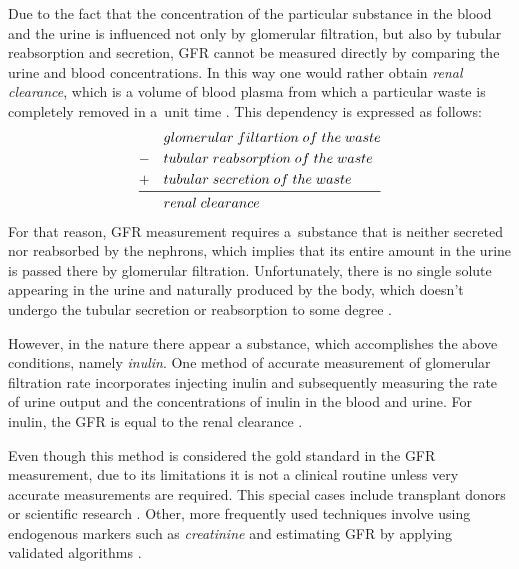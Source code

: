Due to the fact that the concentration of the particular substance in the blood and the urine is influenced not only by glomerular filtration, but also by tubular reabsorption and secretion, GFR cannot be measured directly by comparing the urine and blood concentrations. In this way one would rather obtain \textit{renal clearance}, which is a volume of blood plasma from which a particular waste is completely removed in a~unit time \cite{saladin}. This dependency is expressed as follows:
\begin{equation}
\begin{aligned}
&glomerular\;filtartion\;of\;the\;waste\\
-\quad&tubular\;reabsorption\;of\;the\;waste\\
+\quad&tubular\;secretion\;of\;the\;waste\\
\midrule
&renal\;clearance
\end{aligned}	
\label{eq:gfr_formula}
\end{equation}
For that reason, GFR measurement requires a~substance that is neither secreted nor reabsorbed by the nephrons, which implies that its entire amount in the urine is passed there by glomerular filtration. Unfortunately, there is no single solute appearing in the urine and naturally produced by the body, which doesn't undergo the tubular secretion or reabsorption to some degree \cite{delanaye2012measuring}. 

However, in the nature there appear a substance, which accomplishes the above conditions, namely \textit{inulin}. One method of accurate measurement of glomerular filtration rate incorporates injecting inulin and subsequently measuring the rate of urine output and the concentrations of inulin in the blood and urine. For inulin, the GFR is equal to the renal clearance \cite{saladin, delanaye2012measuring}.


Even though this method is considered the gold standard in the GFR measurement, due to its limitations it is not a clinical routine unless very accurate measurements are required. This special cases include transplant donors or scientific research \cite{traynor2006measure}. 
Other, more frequently used techniques involve using endogenous markers such as \textit{creatinine} and estimating GFR by applying validated algorithms \cite{delanaye2012measuring}. 
 